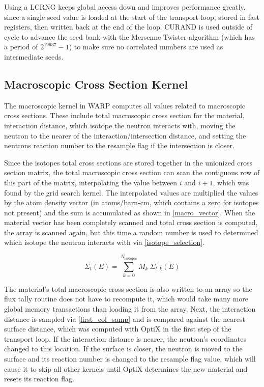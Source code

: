 Using a LCRNG keeps global access down and improves performance greatly, since a single seed value is loaded at the start of the transport loop, stored in fast registers, then written back at the end of the loop.  CURAND is used outside of cycle to advance the seed bank with the Mersenne Twister algorithm (which has a period of $2^{19937} - 1$) to make sure no correlated numbers are used as intermediate seeds.

\subsection{Macroscopic Cross Section Kernel}

The macroscopic kernel in WARP computes all values related to macroscopic cross sections.  These include total macroscopic cross section for the material, interaction distance, which isotope the neutron interacts with, moving the neutron to the nearer of the interaction/intersection distance, and setting the neutrons reaction number to the resample flag if the intersection is closer.  

Since the isotopes total cross sections are stored together in the unionized cross section matrix, the total macroscopic cross section can scan the contiguous row of this part of the matrix, interpolating the value between $i$ and $i+1$, which was found by the grid search kernel.  The interpolated values are multiplied the values by the atom density vector (in atoms/barn-cm, which contains a zero for isotopes not present) and the sum is accumulated as shown in \eqref{macro_vector}.  When the material vector has been completely scanned and total cross section is computed, the array is scanned again, but this time a random number is used to determined which isotope the neutron interacts with via \eqref{isotope_selection}.

\begin{equation}
\Sigma_t(E) = \sum_{k=0}^{N_\mathrm{isotopes}} M_k \: \Sigma_{t,k}(E)
\label{macro_vector}
\end{equation}

The material's total macroscopic cross section is also written to an array so the flux tally routine does not have to recompute it, which would take many more global memory transactions than loading it from the array.  Next, the interaction distance is sampled via \eqref{first_col_samp} and is compared against the nearest surface distance, which was computed with OptiX in the first step of the transport loop.  If the interaction distance is nearer, the neutron's coordinates changed to this location.  If the surface is closer, the neutron is moved to the surface and its reaction number is changed to the resample flag value, which will cause it to skip all other kernels until OptiX determines the new material and resets its reaction flag.

